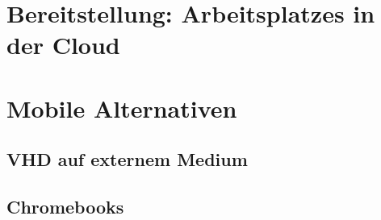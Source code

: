 



\section{Bereitstellung: Arbeitsplatzes in der Cloud}


\section{Mobile Alternativen}

\subsection{VHD auf externem Medium}

\subsection{Chromebooks}
